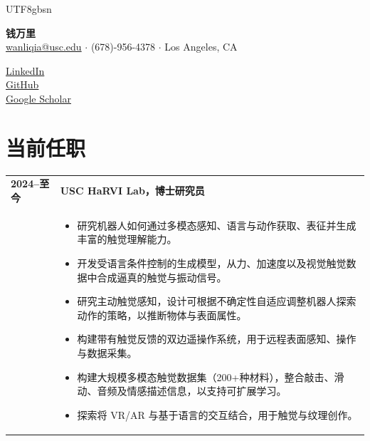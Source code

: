 \documentclass[12pt, letterpaper]{article}
\newlength{\datecolwidth}
\begin{document}
\begin{CJK*}{UTF8}{gbsn}

\noindent
\begin{minipage}[t]{0.65\textwidth}
    {\huge \textbf{钱万里}} \\
    \vspace{2pt}
    \href{mailto:wanliqia@usc.edu}{wanliqia@usc.edu} $\cdot$ (678)-956-4378 $\cdot$ Los Angeles, CA
\end{minipage}%
\begin{minipage}[t]{0.35\textwidth}
    \raggedleft
    \href{https://www.linkedin.com/in/wanli-qian-7bb399192/}{LinkedIn} \\
    \href{https://github.com/silverwings-zero}{GitHub} \\
    \href{https://scholar.google.com/citations?user=azFoAIkAAAAJ&hl=en}{Google Scholar}
\end{minipage}

\vspace{0.2cm}

\section*{当前任职}
\noindent
\begin{tabularx}{\textwidth}{@{}p{\datecolwidth} X@{}}
    \textbf{2024--至今} & \textbf{USC HaRVI Lab，博士研究员} \\
    & \begin{itemize}[leftmargin=*, nosep, after=\vspace{4pt}]
        \item 研究机器人如何通过多模态感知、语言与动作获取、表征并生成丰富的触觉理解能力。
        \item 开发受语言条件控制的生成模型，从力、加速度以及视觉触觉数据中合成逼真的触觉与振动信号。
        \item 研究主动触觉感知，设计可根据不确定性自适应调整机器人探索动作的策略，以推断物体与表面属性。
        \item 构建带有触觉反馈的双边遥操作系统，用于远程表面感知、操作与数据采集。
        \item 构建大规模多模态触觉数据集（200+种材料），整合敲击、滑动、音频及情感描述信息，以支持可扩展学习。
        \item 探索将 VR/AR 与基于语言的交互结合，用于触觉与纹理创作。
    \end{itemize}
\end{tabularx}


\end{CJK*}
\end{document}
